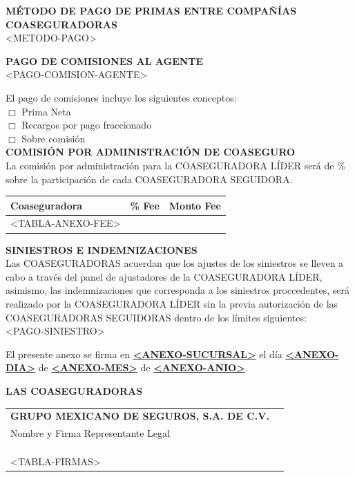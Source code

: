 ﻿\documentclass[letterpaper,10pt]{article}
\begin{document}
\newpage

\textbf{MÉTODO DE PAGO DE PRIMAS ENTRE COMPAÑÍAS COASEGURADORAS}\\

<METODO-PAGO>

\textbf{PAGO DE COMISIONES AL AGENTE}\\

<PAGO-COMISION-AGENTE>

El pago de comisiones incluye los siguientes conceptos:\\

$\Box$ Prima Neta\\
\indent $\Box$ Recargos por pago fraccionado\\
\indent $\Box$ Sobre comisión\\

\textbf{COMISIÓN POR ADMINISTRACIÓN DE COASEGURO}\\

La comisión por administración para la COASEGURADORA LÍDER será de \underline{\hspace{2cm}}\% sobre la participación de cada COASEGURADORA SEGUIDORA.

\begin{center}
    \begin{tabularx}{\textwidth}{|X|c|r|}
        \hline
        \textbf{Coaseguradora} & \textbf{\% Fee} & \textbf{Monto Fee}\\\hline
        <TABLA-ANEXO-FEE>
    \end{tabularx}
\end{center}

\textbf{SINIESTROS E INDEMNIZACIONES}\\

Las COASEGURADORAS acuerdan que los ajustes de los siniestros se lleven a cabo a través del panel de ajustadores de la COASEGURADORA LÍDER, asimismo, las indemnizaciones que corresponda a los siniestros proccedentes, será realizado por la COASEGURADORA LÍDER sin la previa autorización de las COASEGURADORAS SEGUIDORAS dentro de los límites siguientes:\\

<PAGO-SINIESTRO>

\newpage

El presente anexo se firma en \underline{\textbf{<ANEXO-SUCURSAL>}} el día \underline{\textbf{<ANEXO-DIA>}} de \underline{\textbf{<ANEXO-MES>}} de \underline{\textbf{<ANEXO-ANIO>}}.\\

\begin{center}
    \textbf{LAS COASEGURADORAS}\\\vspace{1cm}
    
    \begin{tabularx}{\textwidth}{Xr}
        \textbf{GRUPO MEXICANO DE SEGUROS, S.A. DE C.V.} &\\
        Nombre y Firma Representante Legal & \underline{\hspace{5cm}}\\\\\\\\
        <TABLA-FIRMAS>
    \end{tabularx}
\end{center}
	
\end{document}
